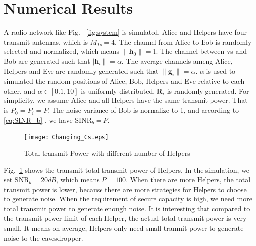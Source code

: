 \documentclass[conference]{IEEEtran}
\begin{document}
\section{Numerical Results} \label{sec:numerical results}
A radio network like Fig. ~\ref{fig:system} is simulated. Alice and Helpers have four transmit antennas, which is $M_{Ts}= 4$. The channel from Alice to Bob is randomly selected and normalized, which means $\|\mathbf{h}_0\| = 1$. The channel between vs and Bob are generated such that $|\mathbf{h}_i\| = \alpha$.  The average channels among Alice, Helpers  and Eve are randomly generated such that $\|\bar{\mathbf{g}}_i\| = \alpha$. $\alpha$ is used to simulated the random positions of Alice, Bob, Helpers and Eve relative to each other, and $\alpha \in  [0.1,10]$ is uniformly distributed.  $\mathbf{R}_i$ is randomly generated. %
For simplicity, we assume Alice and all Helpers have the same transmit power. That is $P_0=P_i = P$. The noise variance of Bob is normalize to 1,  and according to \eqref{eq:SINR_b} , we have $\mathrm{SINR}_b = P$.


\begin{figure}[ht]
	\centering
	\texttt{[image: Changing\_Cs.eps]} %
	\caption{Total transmit Power with different number of Helpers}
	\label{fig:Changing_Cs}
\end{figure}

Fig.~\ref{fig:Changing_Cs} shows the transmit total transmit power of Helpers. In the simulation, we set $\mathrm{SNR}_b = 20 dB$, which means $P = 100$. When there are more Helpers, the total transmit power is lower, because there are more strategies for Helpers to choose to generate noise. When the requirement of secure capacity is high, we need more total transmit power to generate enough noise. It is interesting that compared to the transmit power limit of each Helper, the actual total transmit power is very small. It means on average, Helpers only need small tranmit power to generate noise to the eavesdropper.
\end{document}
